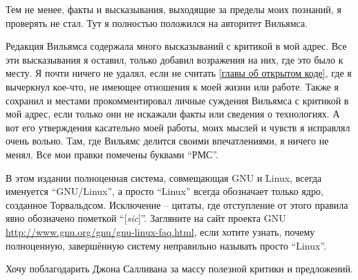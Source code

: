 Тем не менее, факты и высказывания, выходящие за пределы моих познаний, я проверять не стал. Тут я полностью положился на авторитет Вильямса.

Редакция Вильямса содержала много высказываний с критикой в мой адрес. Все эти высказывания я оставил, только добавил возражения на них, где это было к месту. Я почти ничего не удалял, если не считать \autoref{главы об открытом коде}, где я вычеркнул кое-что, не имеющее отношения к моей жизни или работе. Также я сохранил и местами прокомментировал личные суждения Вильямса с критикой в мой адрес, если только они не искажали факты или сведения о технологиях. А вот его утверждения касательно моей работы, моих мыслей и чувств я исправлял очень вольно. Там, где Вильямс делится своими впечатлениями, я ничего не менял. Все мои правки помечены буквами ``РМС''.

В этом издании полноценная система, совмещающая GNU и Linux, всегда именуется ``GNU/Linux'', а просто ``Linux'' всегда обозначает только ядро, созданное Торвальдсом. Исключение -- цитаты, где отступление от этого правила явно обозначено пометкой ``[\textit{sic}]''. Загляните на сайт проекта GNU \url{http://www.gnu.org/gnu/gnu-linux-faq.html}, если хотите узнать, почему полноценную, завершённую систему неправильно называть просто ``Linux''.

Хочу поблагодарить Джона Салливана за массу полезной критики и предложений.
